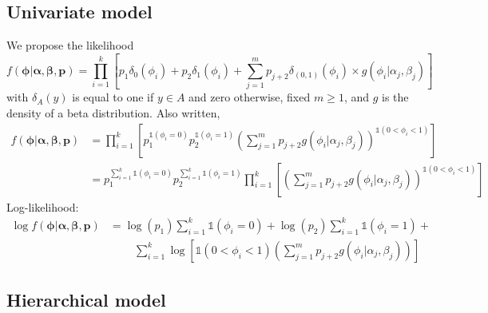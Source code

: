 \documentclass[12pt]{article}
\newcommand{\m}[1]{\mathbf{\bm{#1}}}
\newcommand{\ind}{\mathds{1}}
\begin{document}
\subsection*{Univariate model}

We propose the likelihood
\[ f(\m{\phi}|\m{\alpha},\m{\beta},\m{p}) = \prod_{i=1}^k\left[p_1 \delta_0(\phi_i) + p_2 \delta_1(\phi_i) + \sum_{j=1}^m p_{j+2} \delta_{(0,1)}(\phi_i)\times g(\phi_i|\alpha_j, \beta_j) \right] \]
with $\delta_A(y)$ is equal to one if $y\in A$ and zero otherwise, fixed $m\geq 1$, and $g$ is the density of a beta distribution. Also written,
\begin{align*}
f(\m{\phi}|\m{\alpha},\m{\beta},\m{p}) &= \prod_{i=1}^k\left[p_1^{\ind(\phi_i=0)}p_2^{\ind(\phi_i=1)}\left(\sum_{j=1}^m p_{j+2}g(\phi_i|\alpha_j, \beta_j)\right)^{\ind(0<\phi_i<1)} \right] \\
 &= p_1^{\sum_{i=1}^k\ind(\phi_i=0)}p_2^{\sum_{i=1}^k\ind(\phi_i=1)}\prod_{i=1}^k\left[\left(\sum_{j=1}^m p_{j+2}g(\phi_i|\alpha_j, \beta_j)\right)^{\ind(0<\phi_i<1)} \right]
\end{align*}
Log-likelihood:
\begin{align*}
\log f(\m{\phi}|\m{\alpha},\m{\beta},\m{p}) &= \log(p_1)\sum_{i=1}^k\ind(\phi_i=0)+\log(p_2)\sum_{i=1}^k\ind(\phi_i=1)+ \\
 & ~~~~~ ~~~~~ \sum_{i=1}^k\log\left[\ind(0<\phi_i<1)\left(\sum_{j=1}^m p_{j+2}g(\phi_i|\alpha_j, \beta_j)\right) \right]
\end{align*}

\subsection*{Hierarchical model}



\end{document}
